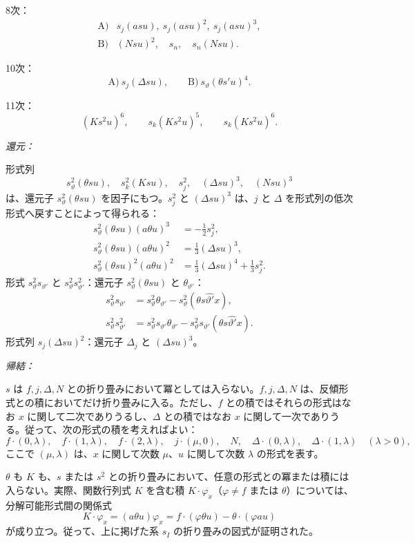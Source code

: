 \documentclass[11pt]{article}
\newcommand{\A}{\Delta}
\begin{document}
\noindent 8次：
\[
\begin{array}{ll}
\text{A)}&s_j(asu),\ s_j(asu)^2,\ s_j(asu)^3,\\[0.4em]
\text{B)}&(Nsu)^2,\quad s_n,\quad s_n(Nsu).
\end{array}
\]

\noindent 10次：
\[
\text{A)}\ s_j(\A su),\qquad \text{B)}\ s_\vartheta(\theta s'u)^4.
\]

\noindent 11次：
\[
(Ks^2u)^6,\qquad s_k(Ks^2u)^5,
\qquad s_k(Ks^2u)^6.
\]

\noindent\emph{還元：}

形式列
\[
 s_\vartheta^2(\theta su),\quad s_k^2(Ksu),\quad s_j^2,\quad (\A su)^3,
 \quad (Nsu)^3
\]
は、還元子 $s_\vartheta^2(\theta su)$ を因子にもつ。$s_j^2$ と $(\A su)^3$ は、$j$ と $\A$ を形式列の低次形式へ戻すことによって得られる：
\[
\begin{aligned}
s_\vartheta^2(\theta su)(a\theta u)^3&=-\frac12s_j^2,\\
s_\vartheta^2(\theta su)(a\theta u)^2&=\frac13(\A su)^3,\\
s_\vartheta^2(\theta su)^2(a\theta u)^2&=\frac13(\A su)^4+\frac13s_j^2.
\end{aligned}
\]
形式 $s_\vartheta^2s_{\vartheta'}$ と $s_\vartheta^2s_{\vartheta'}^2$：還元子 $s_\vartheta^2(\theta su)$ と $\theta_{\vartheta'}$：
\[
\begin{aligned}
s_\vartheta^2s_{\vartheta'}&=s_\vartheta^2\theta_{\vartheta'}-s_\vartheta^2(\theta s\widehat{\vartheta'}x),\\
s_\vartheta^2s_{\vartheta'}^2&=s_\vartheta^2s_{\vartheta'}\theta_{\vartheta'}-s_\vartheta^2s_{\vartheta'}(\theta s\widehat{\vartheta'}x).
\end{aligned}
\]
形式列 $s_j(\A su)^2$：還元子 $\A_j$ と $(\A su)^3$。

\noindent\emph{帰結：}

$s$ は $f,j,\A,N$ との折り畳みにおいて冪としては入らない。$f,j,\A,N$ は、反傾形式との積においてだけ折り畳みに入る。ただし、$f$ との積ではそれらの形式はなお $x$ に関して二次でありうるし、$\A$ との積ではなお $x$ に関して一次でありうる。従って、次の形式の積を考えればよい：
\[
 f\cdot(0,\lambda),\quad f\cdot(1,\lambda),\quad f\cdot(2,\lambda),\quad
 j\cdot(\mu,0),\quad N,\quad
 \A\cdot(0,\lambda),\quad \A\cdot(1,\lambda)\quad(\lambda>0),
\]
ここで $(\mu,\lambda)$ は、$x$ に関して次数 $\mu$、$u$ に関して次数 $\lambda$ の形式を表す。

$\theta$ も $K$ も、$s$ または $s^2$ との折り畳みにおいて、任意の形式との冪または積には入らない。実際、関数行列式 $K$ を含む積 $K\cdot\varphi_x$（$\varphi\ne f$ または $\theta$）については、分解可能形式間の関係式
\[
 K\cdot\varphi_x=(a\theta u)\varphi_x=f\cdot(\varphi\theta u)-\theta\cdot(\varphi au)
\]
が成り立つ。従って、上に掲げた系 $s_I$ の折り畳みの図式が証明された。
\end{document}

